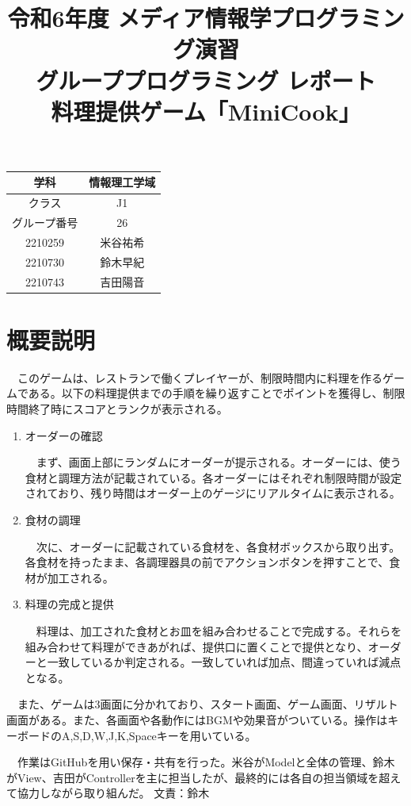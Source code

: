 \documentclass[a4j]{jsarticle} %
\title{令和6年度 メディア情報学プログラミング演習\\グループプログラミング レポート\\料理提供ゲーム「MiniCook」}
\begin{document}
\maketitle

\begin{center}%
  \begin{tabular}{|c||c|}
      \hline
      学科&情報理工学域\\
      \hline
      クラス&J1\\
      \hline
      グループ番号&26\\
      \hline
      2210259&米谷祐希\\
      \hline
      2210730&鈴木早紀\\
      \hline
      2210743&吉田陽音\\
      \hline
  \end{tabular}
\end{center}

\newpage

\section{概要説明}
　このゲームは、レストランで働くプレイヤーが、制限時間内に料理を作るゲームである。以下の料理提供までの手順を繰り返すことでポイントを獲得し、制限時間終了時にスコアとランクが表示される。
\begin{enumerate}
  \item オーダーの確認\par
  　まず、画面上部にランダムにオーダーが提示される。オーダーには、使う食材と調理方法が記載されている。各オーダーにはそれぞれ制限時間が設定されており、残り時間はオーダー上のゲージにリアルタイムに表示される。
  \item 食材の調理\par
  　次に、オーダーに記載されている食材を、各食材ボックスから取り出す。各食材を持ったまま、各調理器具の前でアクションボタンを押すことで、食材が加工される。
  \item 料理の完成と提供\par
  　料理は、加工された食材とお皿を組み合わせることで完成する。それらを組み合わせて料理ができあがれば、提供口に置くことで提供となり、オーダーと一致しているか判定される。一致していれば加点、間違っていれば減点となる。   
\end{enumerate}
　また、ゲームは3画面に分かれており、スタート画面、ゲーム画面、リザルト画面がある。また、各画面や各動作にはBGMや効果音がついている。操作はキーボードのA,S,D,W,J,K,Spaceキーを用いている。\par
　作業はGitHubを用い保存・共有を行った。米谷がModelと全体の管理、鈴木がView、吉田がControllerを主に担当したが、最終的には各自の担当領域を超えて協力しながら取り組んだ。
文責：鈴木
\end{document}
